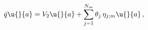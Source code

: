 \begin{equation*}
  \dot{q}\u{}{a} = V_{2}\u{}{a} + \sum_{j=1}^{N_{m}}
  \theta_j\,\eta_{j;{m}}\u{}{a}\,,
\end{equation*}

